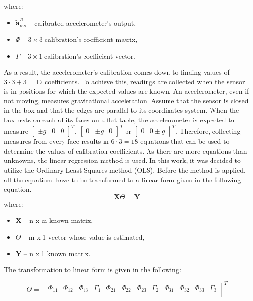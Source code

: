 where:
\begin{itemize}
	\item $\bm{\tilde{a}}_{res}^B$ -- calibrated accelerometer's output,
	\item $\bm{\varPhi}$ -- $3 \times 3$ calibration's coefficient matrix,
	\item $\bm{\varGamma}$ -- $3 \times 1$ calibration's coefficient vector.
\end{itemize}
As a result, the accelerometer’s calibration comes down to finding values of $3 \cdot 3 + 3 = 12$ coefficients. To achieve this, readings are collected when the sensor is in positions for which the expected values are known. An accelerometer, even if not moving, measures gravitational acceleration. Assume that the sensor is closed in the box and that the edges are parallel to its coordinates system. When the box rests on each of its faces on a flat table, the accelerometer is expected to measure $\begin{bmatrix}\pm g & 0 & 0\end{bmatrix}^T$, $\begin{bmatrix}0 & \pm g & 0\end{bmatrix}^T$ or $\begin{bmatrix} 0 & 0 \pm g\end{bmatrix}^T$. Therefore, collecting measures from every face results in $6 \cdot 3 = 18$ equations that can be used to determine the values of calibration coefficients. As there are more equations than unknowns, the linear regression method is used. In this work, it was decided to utilize the Ordinary Least Squares method (OLS). Before the method is applied, all the equations have to be transformed to a linear form given in the following equation.
\begin{equation}
	\bm{X} \bm{\varTheta} = \bm{Y}
	\label{ols}
\end{equation}
where:
\begin{itemize}
	\item $\bm{X}$ -- n x m known matrix,
	\item $\bm{\varTheta}$ -- m x 1 vector whose value is estimated,
	\item $\bm{Y}$ -- n x 1 known matrix.
\end{itemize}
 
The transformation to linear form is given in the following:
\setcounter{MaxMatrixCols}{25}

\begin{equation}
	\bm{\varTheta} = \begin{bmatrix} \varPhi_{11} & \varPhi_{12} & \varPhi_{13} & \varGamma_1 & \varPhi_{21} & \varPhi_{22} & \varPhi_{23} & \varGamma_2 & \varPhi_{31} & \varPhi_{32} & \varPhi_{33} & \varGamma_3 \\
	\end{bmatrix}^T
	\label{ols_theta}
\end{equation}


